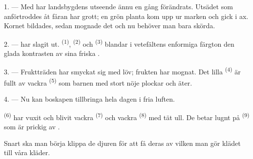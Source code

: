 %


\VUsaut{5.0mm}
\VUsaut{3.0mm}
\VUsaut{3.0mm}
\VUsaut{4.0mm}
\VUsaut{3.0mm}

1. --- Med  har landsbygdens utseende ännu en gång förändrats. Utsädet som
anförtroddes åt fåran har grott; en grön planta kom upp ur marken och gick i ax. Kornet
bildades, sedan mognade det och nu behöver man bara skörda.

2. ---  har slagit ut.  \textsuperscript{(1)},
 \textsuperscript{(2)} och
 \textsuperscript{(3)} blandar i vetefältens enformiga
färgton den glada kontrasten av sina friska .

3. --- Fruktträden har smyckat sig med löv; frukten har mognat. Det lilla
 \textsuperscript{(4)} är fullt av vackra
 \textsuperscript{(5)} som barnen med stort nöje plockar och
äter.

4. --- Nu kan boskapen tillbringa hela dagen i fria luften.

 \textsuperscript{(6)} har vuxit och blivit vackra
 \textsuperscript{(7)} och vackra 
\textsuperscript{(8)} med tät ull. De betar lugnt  på
 \textsuperscript{(9)} som är prickig av
.

Snart ska man börja klippa de djuren för att få deras  av vilken man gör klädet
till våra kläder.

